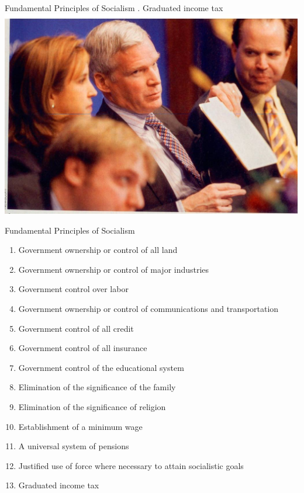 \begin{frame}{Fundamental Principles of Socialism}
    . Graduated income tax \\
    \includegraphics[width=.9\textwidth]{img/graduated-tax.jpg} \\
\end{frame}

\begin{frame}{Fundamental Principles of Socialism}
    \begin{enumerate}
        \item Government ownership or control of all land
        \item Government ownership or control of major industries
        \item Government control over labor
        \item Government ownership or control of communications and transportation
        \item Government control of all credit
        \item Government control of all insurance
        \item Government control of the educational system
        \item Elimination of the significance of the family
        \item Elimination of the significance of religion
        \item Establishment of a minimum wage
        \item A universal system of pensions
        \item Justified use of force where necessary to attain socialistic goals
        \item Graduated income tax
    \end{enumerate}
\end{frame}

